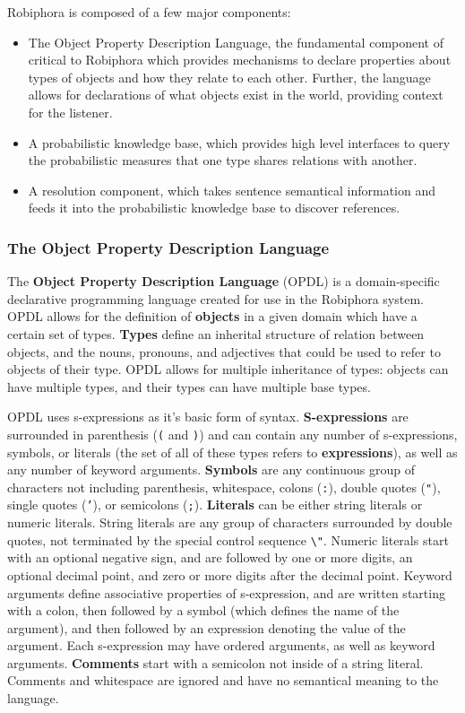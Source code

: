 \documentclass[12pt]{article}
\begin{document}
Robiphora is composed of a few major components:
\begin{itemize}
    \item The Object Property Description Language, the fundamental component
        of critical to Robiphora which provides mechanisms to declare
        properties about types of objects and how they relate to each other.
        Further, the language allows for declarations of what objects exist in
        the world, providing context for the listener.
    \item A probabilistic knowledge base, which provides high level interfaces
        to query the probabilistic measures that one type shares relations with
        another.
    \item A resolution component, which takes sentence semantical information
        and feeds it into the probabilistic knowledge base to discover
        references.
\end{itemize}

\subsubsection{The Object Property Description Language}

The \textbf{Object Property Description Language} (OPDL) is a domain-specific
declarative programming language created for use in the Robiphora system. OPDL
allows for the definition of \textbf{objects} in a given domain which have a
certain set of types. \textbf{Types} define an inherital structure of relation
between objects, and the nouns, pronouns, and adjectives that could be used to
refer to objects of their type. OPDL allows for multiple inheritance of types:
objects can have multiple types, and their types can have multiple base types.

OPDL uses s-expressions as it's basic form of syntax. \textbf{S-expressions}
are surrounded in parenthesis (\texttt{(} and \texttt{)}) and can contain any
number of s-expressions, symbols, or literals (the set of all of these types
refers to \textbf{expressions}), as well as any number of keyword arguments.
\textbf{Symbols} are any continuous group of characters not including
parenthesis, whitespace, colons (\texttt{:}), double quotes (\texttt{"}),
single quotes (\texttt{'}), or semicolons (\texttt{;}).  \textbf{Literals} can
be either string literals or numeric literals. String literals are any group of
characters surrounded by double quotes, not terminated by the special control
sequence \texttt{\textbackslash"}. Numeric literals start with an optional
negative sign, and are followed by one or more digits, an optional decimal
point, and zero or more digits after the decimal point. Keyword arguments
define associative properties of s-expression, and are written starting with a
colon, then followed by a symbol (which defines the name of the argument), and
then followed by an expression denoting the value of the argument. Each
s-expression may have ordered arguments, as well as keyword arguments.
\textbf{Comments} start with a semicolon not inside of a string literal.
Comments and whitespace are ignored and have no semantical meaning to the
language.
\end{document}

